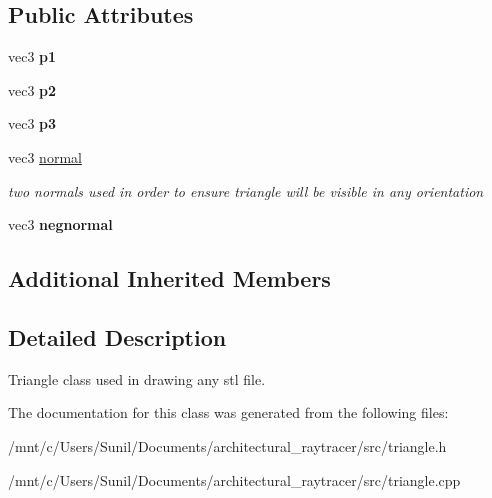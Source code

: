 \subsection*{Public Attributes}
\begin{DoxyCompactItemize}
\item 
\mbox{\label{classtriangle_a4267b8eadc087f60f67e1681e1891216}} 
vec3 {\bfseries p1}
\item 
\mbox{\label{classtriangle_aaac41c4b79a5cb6c54a945d1bdaf0fe4}} 
vec3 {\bfseries p2}
\item 
\mbox{\label{classtriangle_a528a59a6e5519ea9a5835d458fb19dc1}} 
vec3 {\bfseries p3}
\item 
\mbox{\label{classtriangle_ac0103b1d5b30325a6b785b50bd9eba8a}} 
vec3 \hyperlink{classtriangle_ac0103b1d5b30325a6b785b50bd9eba8a}{normal}
\begin{DoxyCompactList}\small\item\em two normals used in order to ensure triangle will be visible in any orientation \end{DoxyCompactList}\item 
\mbox{\label{classtriangle_ad7c01593b389e593f371e2b3011b96a5}} 
vec3 {\bfseries negnormal}
\end{DoxyCompactItemize}
\subsection*{Additional Inherited Members}


\subsection{Detailed Description}
Triangle class used in drawing any stl file. 

The documentation for this class was generated from the following files\+:\begin{DoxyCompactItemize}
\item 
/mnt/c/\+Users/\+Sunil/\+Documents/architectural\+\_\+raytracer/src/triangle.\+h\item 
/mnt/c/\+Users/\+Sunil/\+Documents/architectural\+\_\+raytracer/src/triangle.\+cpp\end{DoxyCompactItemize}
